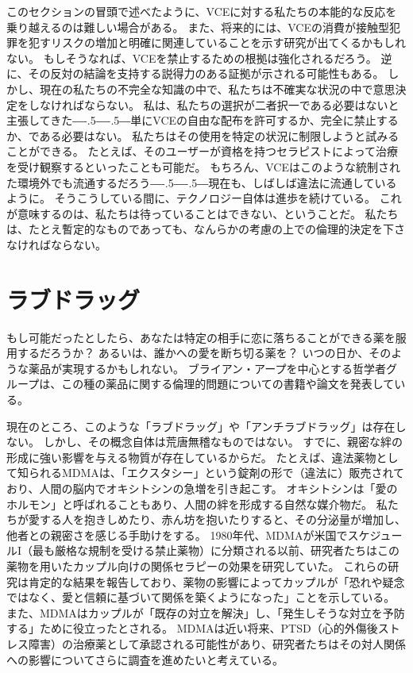 \documentclass[paper=a4,book,openany]{jlreq}
\def\DDASH{―\kern-.5\zw―\kern-.5\zw―} %
\begin{document}
このセクションの冒頭で述べたように、VCEに対する私たちの本能的な反応を乗り越えるのは難しい場合がある。
また、将来的には、VCEの消費が接触型犯罪を犯すリスクの増加と明確に関連していることを示す研究が出てくるかもしれない。
もしそうなれば、VCEを禁止するための根拠は強化されるだろう。
逆に、その反対の結論を支持する説得力のある証拠が示される可能性もある。
しかし、現在の私たちの不完全な知識の中で、私たちは不確実な状況の中で意思決定をしなければならない。
私は、私たちの選択が二者択一である必要はないと主張してきた{\DDASH}単にVCEの自由な配布を許可するか、完全に禁止するか、である必要はない。
私たちはその使用を特定の状況に制限しようと試みることができる。
たとえば、そのユーザーが資格を持つセラピストによって治療を受け観察するといったことも可能だ。
もちろん、VCEはこのような統制された環境外でも流通するだろう{\DDASH}現在も、しばしば違法に流通しているように。
そうこうしている間に、テクノロジー自体は進歩を続けている。
これが意味するのは、私たちは待っていることはできない、ということだ。
私たちは、たとえ暫定的なものであっても、なんらかの考慮の上での倫理的決定を下さなければならない。

\section{ラブドラッグ}

もし可能だったとしたら、あなたは特定の相手に恋に落ちることができる薬を服用するだろうか？ あるいは、誰かへの愛を断ち切る薬を？ いつの日か、そのような薬品が実現するかもしれない。
ブライアン・アープを中心とする哲学者グループは、この種の薬品に関する倫理的問題についての書籍や論文を発表している。

現在のところ、このような「ラブドラッグ」や「アンチラブドラッグ」は存在しない。
しかし、その概念自体は荒唐無稽なものではない。
すでに、親密な絆の形成に強い影響を与える物質が存在しているからだ。
たとえば、違法薬物として知られるMDMAは、「エクスタシー」という錠剤の形で（違法に）販売されており、人間の脳内でオキシトシンの急増を引き起こす。
オキシトシンは「愛のホルモン」と呼ばれることもあり、人間の絆を形成する自然な媒介物だ。
私たちが愛する人を抱きしめたり、赤ん坊を抱いたりすると、その分泌量が増加し、他者との親密さを感じる手助けをする。
1980年代、MDMAが米国でスケジュールI（最も厳格な規制を受ける禁止薬物）に分類される以前、研究者たちはこの薬物を用いたカップル向けの関係セラピーの効果を研究していた。
これらの研究は肯定的な結果を報告しており、薬物の影響によってカップルが「恐れや疑念ではなく、愛と信頼に基づいて関係を築くようになった」ことを示している。
また、MDMAはカップルが「既存の対立を解決」し、「発生しそうな対立を予防する」ために役立ったとされる\citep[p.378]{greer98:_method_conduc_therap_session_mdma}。
MDMAは近い将来、PTSD（心的外傷後ストレス障害）の治療薬として承認される可能性があり、研究者たちはその対人関係への影響についてさらに調査を進めたいと考えている。
\end{document}
